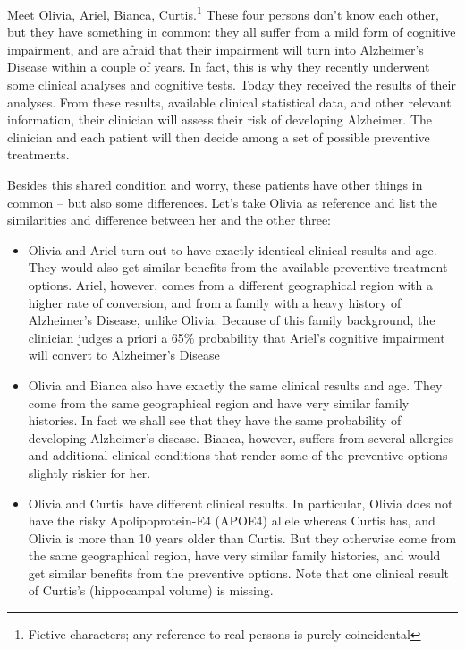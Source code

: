 \documentclass[utf8]{FrontiersinHarvard} %
\renewcommand*{\|}[1][]{\nonscript\:#1\vert\nonscript\:\mathopen{}}
\begin{document}
Meet Olivia, Ariel, Bianca, Curtis.\footnote{Fictive characters; any reference to real persons is purely coincidental}
These four persons don't know each other, but they have something in common: they all suffer from a mild form of cognitive impairment, and are afraid that their impairment will turn into Alzheimer's Disease within a couple of years. In fact, this is why they recently underwent some clinical analyses and cognitive tests. Today they received the results of their analyses. From these results, available clinical statistical data, and other relevant information, their clinician will assess their risk of developing Alzheimer. The clinician and each patient will then decide among a set of possible preventive treatments.

Besides this shared condition and worry, these patients have other things in common -- but also some differences. Let's take Olivia as reference and list the similarities and difference between her and the other three:
\begin{itemize}
\item Olivia and Ariel turn out to have exactly identical clinical results and age. They would also get similar benefits from the available preventive-treatment options. Ariel, however, comes from a different geographical region with a higher rate of conversion, and from a family with a heavy history of Alzheimer's Disease, unlike Olivia. Because of this family background, the clinician judges a priori a 65\% probability that Ariel's cognitive impairment will convert to Alzheimer's Disease

\item Olivia and Bianca also have exactly the same clinical results and age. They come from the same geographical region and have very similar family histories. In fact we shall see that they have the same probability of developing Alzheimer's disease. Bianca, however, suffers from several allergies and additional clinical conditions that render some of the preventive options slightly riskier for her.

\item Olivia and Curtis have different clinical results. In particular, Olivia does not have the risky Apolipoprotein-E4 (APOE4) allele \citep{liuetal2013} whereas Curtis has, and Olivia is more than 10 years older than Curtis. But they otherwise come from the same geographical region, have very similar family histories, and would get similar benefits from the preventive options. Note that one clinical result of Curtis's (hippocampal volume) is missing.
\end{itemize}
\end{document}
